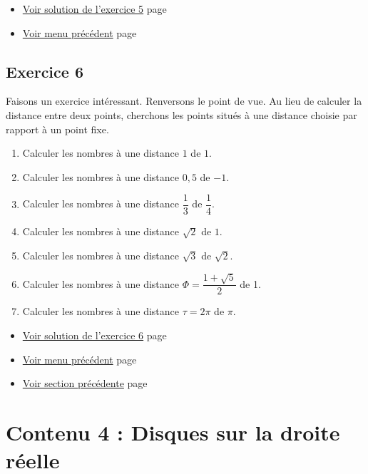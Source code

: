 \documentclass[a4paper,11pt]{book}
\begin{document}
\begin{itemize}
\item \hyperref[orgc2047b6]{Voir solution de l'exercice 5}
page~\pageref{page:sec8.3.1sol5}
\item \hyperref[org68323fe]{Voir menu précédent}
page~\pageref{page:content3-menu}
\end{itemize}

\clearpage

\section{Exercice 6}
\label{sec:org506f969}
\label{org4ecd154}
\label{page:sec2.3.3exo6}

Faisons un exercice intéressant. Renversons le point de vue. Au
lieu de calculer la distance entre deux points,
cherchons les points situés à une distance choisie par rapport à un
point fixe.


\begin{enumerate}
\item Calculer les nombres à une distance \(1\) de \(1\).
\item Calculer les nombres à une distance \(0,5\) de \(-1\).
\item Calculer les nombres à une distance \(\dfrac{1}{3}\) de \(\dfrac{1}{4}\).
\item Calculer les nombres à une distance \(\sqrt{2}\) de \(1\).
\item Calculer les nombres à une distance \(\sqrt{3}\) de \(\sqrt{2}\).
\item Calculer les nombres à une distance \(\Phi = \dfrac{1 +
   \sqrt{5}}{2}\) de 1.
\item Calculer les nombres à une distance \(\tau = 2\pi\) de \(\pi\).
\end{enumerate}


\begin{itemize}
\item \hyperref[orge0c2cd7]{Voir solution de l'exercice 6}
page~\pageref{page:sec8.3.2sol6}
\item \hyperref[org68323fe]{Voir menu précédent}
page~\pageref{page:content3-menu}
\item \hyperref[orged79065]{Voir section précédente}
page~\pageref{page:sec2.3.1intro-distance}
\end{itemize}

\clearpage

\chapter{Contenu 4 : Disques sur la droite réelle}
\label{sec:orgb639d21}
\label{orgbdb89e7}
\label{page:sec2.4content4}
\end{document}
